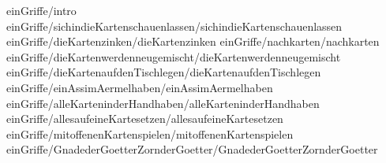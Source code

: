 
 {einGriffe/intro}
 {einGriffe/sichindieKartenschauenlassen/sichindieKartenschauenlassen}
 {einGriffe/dieKartenzinken/dieKartenzinken}
 {einGriffe/nachkarten/nachkarten}
 {einGriffe/dieKartenwerdenneugemischt/dieKartenwerdenneugemischt}
 {einGriffe/dieKartenaufdenTischlegen/dieKartenaufdenTischlegen}
 {einGriffe/einAssimAermelhaben/einAssimAermelhaben}
 {einGriffe/alleKarteninderHandhaben/alleKarteninderHandhaben}
 {einGriffe/allesaufeineKartesetzen/allesaufeineKartesetzen}
 {einGriffe/mitoffenenKartenspielen/mitoffenenKartenspielen}
 {einGriffe/GnadederGoetterZornderGoetter/GnadederGoetterZornderGoetter}
